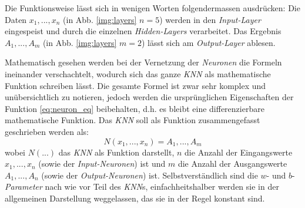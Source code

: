 Die Funktionsweise lässt sich in wenigen Worten folgendermassen ausdrücken: Die Daten $x_1,...,x_n$ (in Abb. \ref{img:layers} $n=5$) werden in den \textit{Input-Layer} eingespeist und durch die einzelnen \textit{Hidden-Layers} verarbeitet. Das Ergebnis $A_1,...,A_m$ (in Abb. \ref{img:layers} $m=2$) lässt sich am \textit{Output-Layer} ablesen. 

Mathematisch gesehen werden bei der Vernetzung der \textit{Neuronen} die Formeln ineinander verschachtelt, wodurch sich das ganze \textit{KNN} als mathematische Funktion schreiben lässt. Die gesamte Formel ist zwar sehr komplex und unübersichtlich zu notieren, jedoch werden die ursprünglichen Eigenschaften der Funktion \ref{eq:neuron_eq} beibehalten, d.h. es bleibt eine differenzierbare mathematische Funktion. Das \textit{KNN} soll als Funktion zusammengefasst geschrieben werden als:
\begin{equation}\label{eq:ann}
N(x_1,...,x_n) = A_1,...,A_m
\end{equation}
wobei $N(...)$ das \textit{KNN} als Funktion darstellt, $n$ die Anzahl der Eingangswerte $x_1,...,x_n$ (sowie der \textit{Input-Neuronen}) ist und $m$ die Anzahl der Ausgangswerte $A_1,...,A_n$ (sowie der \textit{Output-Neuronen}) ist. Selbstverständlich sind die $w$- und $b$-\textit{Parameter} nach wie vor Teil des \textit{KNN}s, einfachheitshalber werden sie in der allgemeinen Darstellung weggelassen, das sie in der Regel konstant sind.


